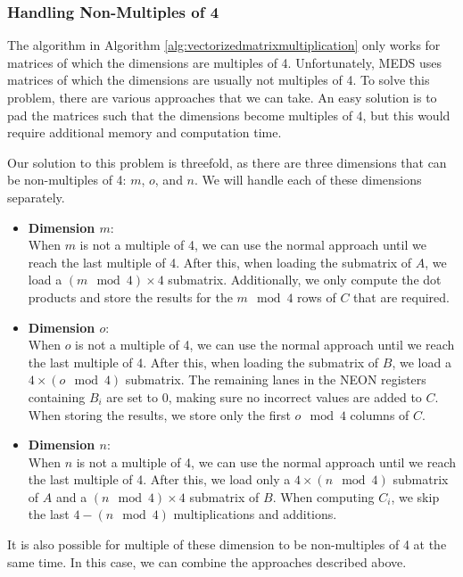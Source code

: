 \documentclass[11pt,a4paper]{report}
\theoremstyle{definition}
\begin{document}
\subsubsection{Handling Non-Multiples of 4}
The algorithm in Algorithm \ref{alg:vectorizedmatrixmultiplication} only works for matrices of which the dimensions are multiples of 4. Unfortunately, MEDS uses matrices of which the dimensions are usually not multiples of 4. To solve this problem, there are various approaches that we can take. An easy solution is to pad the matrices such that the dimensions become multiples of 4, but this would require additional memory and computation time.

Our solution to this problem is threefold, as there are three dimensions that can be non-multiples of 4: $m$, $o$, and $n$. We will handle each of these dimensions separately.
\begin{itemize}
  \item \textbf{Dimension $m$}:\\
  When $m$ is not a multiple of 4, we can use the normal approach until we reach the last multiple of 4. After this, when loading the submatrix of $A$, we load a $(m \mod 4) \times 4$ submatrix. Additionally, we only compute the dot products and store the results for the $m \mod 4$ rows of $C$ that are required.
  \item \textbf{Dimension $o$}:\\
  When $o$ is not a multiple of 4, we can use the normal approach until we reach the last multiple of 4. After this, when loading the submatrix of $B$, we load a $4 \times (o \mod 4)$ submatrix. The remaining lanes in the NEON registers containing $B_i$ are set to 0, making sure no incorrect values are added to $C$. When storing the results, we store only the first $o \mod 4$ columns of $C$.
  \item \textbf{Dimension $n$}:\\
  When $n$ is not a multiple of 4, we can use the normal approach until we reach the last multiple of 4. After this, we load only a $4 \times (n \mod 4)$ submatrix of $A$ and a $(n \mod 4) \times 4$ submatrix of $B$. When computing $C_i$, we skip the last $4 - (n \mod 4)$ multiplications and additions.
\end{itemize}
It is also possible for multiple of these dimension to be non-multiples of 4 at the same time. In this case, we can combine the approaches described above.
\end{document}
